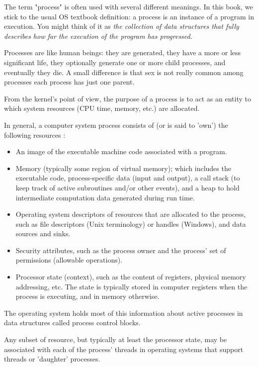 The term "process" is often used with several different meanings. In this book, we stick
to the usual OS textbook definition: a process is an instance of a program in
execution. You might think of it as \emph{the collection of data structures that fully
  describes how far the execution of the program has progressed}. 

Processes are like human beings: they are generated, they have a more or less significant
life, they optionally generate one or more child processes, and eventually they die. A
small difference is that sex is not really common among processes each process has just
one parent.

From the kernel's point of view, the purpose of a process is to act as an entity to which
system resources (CPU time, memory, etc.) are allocated.

In general, a computer system process consists of (or is said to 'own') the following
resources :
\begin{itemize}
\item An image of the executable machine code associated with a program.
\item Memory (typically some region of virtual memory); which includes the executable
  code, process-specific data (input and output), a call stack (to keep track of active
  subroutines and/or other events), and a heap to hold intermediate computation data
  generated during run time.
\item Operating system descriptors of resources that are allocated to the process, such as
  file descriptors (Unix terminology) or handles (Windows), and data sources and sinks.
\item Security attributes, such as the process owner and the process' set of permissions
  (allowable operations).
\item Processor state (context), such as the content of registers, physical memory
  addressing, etc. The state is typically stored in computer registers when the process is
  executing, and in memory otherwise.
\end{itemize}
The operating system holds most of this information about active processes in data
structures called process control blocks.

Any subset of resource, but typically at least the processor state, may be associated with
each of the process' threads in operating systems that support threads or 'daughter'
processes.

